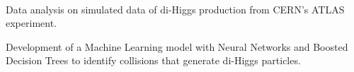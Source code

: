 \documentclass[a4paper]{MagicalCV}
\begin{document}
\hfill
\begin{minipage}[t]{0.66\textwidth} 


 \\
\vspace{\topsep} %
\begin{tightemize}
    \item Data analysis on simulated data of di-Higgs production from CERN's ATLAS experiment.
    \item Development of a Machine Learning model with Neural Networks and Boosted Decision Trees to identify collisions that generate di-Higgs particles.
\end{tightemize}
\vspace{0.25ex}
\sectionsep


\end{minipage}
\end{document}
